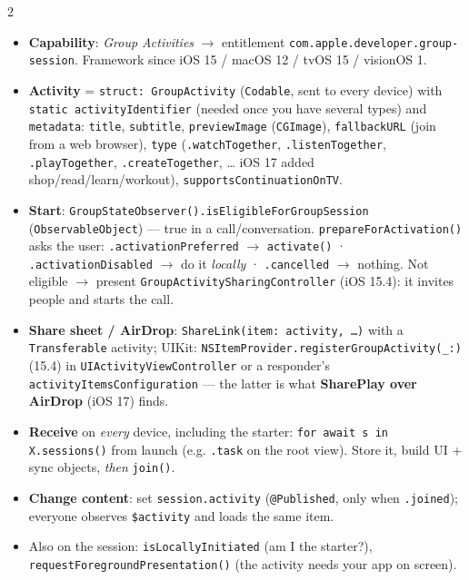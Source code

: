 \documentclass[8pt]{extarticle}
\newcommand\ct[1]{\texttt{#1}}
\newcommand\hd[1]{\par\vspace{3pt}\noindent{\bfseries\color{sheetBlue}#1}\par\vspace{1pt}}
\begin{document}
\begin{multicols}{2}
\raggedright\small{}

\hd{How it works}
\begin{itemize}
  \item \textbf{Capability}: \emph{Group Activities} $\to$ entitlement \ct{com.apple.developer.group-session}.
        Framework since iOS 15 / macOS 12 / tvOS 15 / visionOS 1.
  \item \textbf{Activity} = \ct{struct: GroupActivity} (\ct{Codable}, sent to every device) with
        \ct{static activityIdentifier} (needed once you have several types) and \ct{metadata}:
        \ct{title}, \ct{subtitle}, \ct{previewImage} (\ct{CGImage}), \ct{fallbackURL} (join from a web
        browser), \ct{type} (\ct{.watchTogether}, \ct{.listenTogether}, \ct{.playTogether},
        \ct{.createTogether}, … iOS 17 added shop/read/learn/workout), \ct{supportsContinuationOnTV}.
  \item \textbf{Start}: \ct{GroupStateObserver().isEligibleForGroupSession} (\ct{ObservableObject}) —
        true in a call/conversation. \ct{prepareForActivation()} asks the user:
        \ct{.activationPreferred} $\to$ \ct{activate()} · \ct{.activationDisabled} $\to$ do it
        \emph{locally} · \ct{.cancelled} $\to$ nothing. Not eligible $\to$ present
        \ct{GroupActivitySharingController} (iOS 15.4): it invites people and starts the call.
  \item \textbf{Share sheet / AirDrop}: \ct{ShareLink(item: activity, …)} with a \ct{Transferable}
        activity; UIKit: \ct{NSItemProvider.registerGroupActivity(\_:)} (15.4) in
        \ct{UIActivityViewController} or a responder's \ct{activityItemsConfiguration} — the
        latter is what \textbf{SharePlay over AirDrop} (iOS 17) finds.
  \item \textbf{Receive} on \emph{every} device, including the starter: \ct{for await s in
        X.sessions()} from launch (e.g. \ct{.task} on the root view). Store it, build UI +
        sync objects, \emph{then} \ct{join()}.
  \item \textbf{Change content}: set \ct{session.activity} (\ct{@Published}, only when
        \ct{.joined}); everyone observes \ct{\$activity} and loads the same item.
  \item Also on the session: \ct{isLocallyInitiated} (am I the starter?),
        \ct{requestForegroundPresentation()} (the activity needs your app on screen).
\end{itemize}


\end{multicols}
\end{document}
